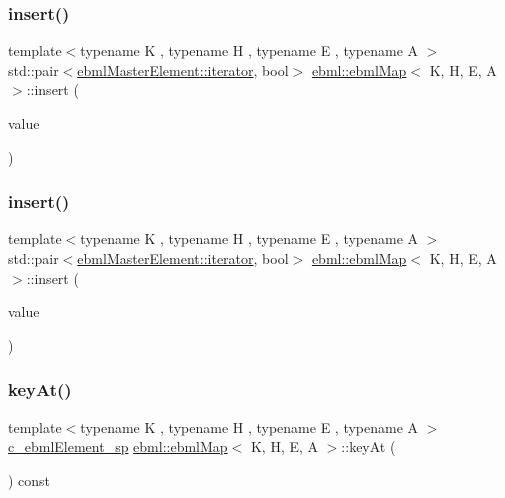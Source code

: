 \subsubsection{\texorpdfstring{insert()}{insert()}\hspace{0.1cm}{\footnotesize\ttfamily [5/6]}}
{\footnotesize\ttfamily template$<$typename K , typename H , typename E , typename A $>$ \\
std\+::pair$<$\mbox{\hyperlink{classebml_1_1ebmlMasterElement_1_1iterator}{ebml\+Master\+Element\+::iterator}}, bool$>$ \mbox{\hyperlink{classebml_1_1ebmlMap}{ebml\+::ebml\+Map}}$<$ K, H, E, A $>$\+::insert (\begin{DoxyParamCaption}\item[{const std\+::pair$<$ K, \mbox{\hyperlink{namespaceebml_adad533b7705a16bb360fe56380c5e7be}{ebml\+Element\+\_\+sp}} $>$ \&}]{value }\end{DoxyParamCaption})}

\mbox{\label{classebml_1_1ebmlMap_a34252351567bad0ac7b844ee7e51095b}} 
\subsubsection{\texorpdfstring{insert()}{insert()}\hspace{0.1cm}{\footnotesize\ttfamily [6/6]}}
{\footnotesize\ttfamily template$<$typename K , typename H , typename E , typename A $>$ \\
std\+::pair$<$\mbox{\hyperlink{classebml_1_1ebmlMasterElement_1_1iterator}{ebml\+Master\+Element\+::iterator}}, bool$>$ \mbox{\hyperlink{classebml_1_1ebmlMap}{ebml\+::ebml\+Map}}$<$ K, H, E, A $>$\+::insert (\begin{DoxyParamCaption}\item[{std\+::pair$<$ K, \mbox{\hyperlink{namespaceebml_adad533b7705a16bb360fe56380c5e7be}{ebml\+Element\+\_\+sp}} $>$ \&\&}]{value }\end{DoxyParamCaption})}

\mbox{\label{classebml_1_1ebmlMap_afabb04ac79f0daaf31be77832313a7bc}} 
\subsubsection{\texorpdfstring{key\+At()}{keyAt()}}
{\footnotesize\ttfamily template$<$typename K , typename H , typename E , typename A $>$ \\
\mbox{\hyperlink{namespaceebml_a2deef4e8071531b32e3533f1bf978917}{c\+\_\+ebml\+Element\+\_\+sp}} \mbox{\hyperlink{classebml_1_1ebmlMap}{ebml\+::ebml\+Map}}$<$ K, H, E, A $>$\+::key\+At (\begin{DoxyParamCaption}\item[{const K \&}]{ }\end{DoxyParamCaption}) const}

